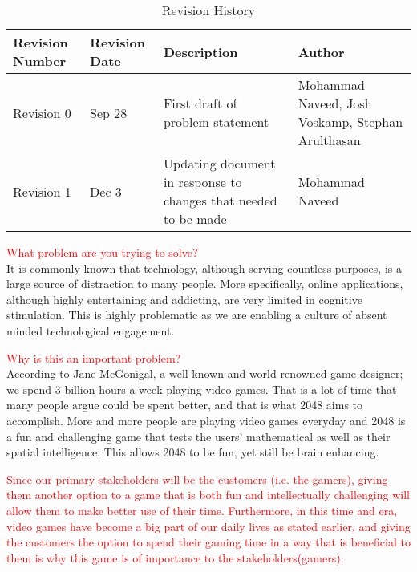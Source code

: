 \documentclass[12pt]{article}
\begin{document}
\begin{titlepage}



		\vfill %

\end{titlepage}
\begin{table}[H]
	\color{red}
	\centering
	\begin{tabular}{ | p{2cm} |  p{2cm} | p{5cm} | p{3.8cm} |}
    \hline
    Revision Number & Revision Date & Description & Author \\ \hline
		Revision 0 & Sep 28 & First draft of problem statement & Mohammad Naveed, Josh Voskamp, Stephan Arulthasan \\\hline
		Revision 1 & Dec 3 & Updating document in response to changes that needed to be made & Mohammad Naveed \\\hline
	\end{tabular}
	\caption{Revision History}
\end{table}
\newpage

\textcolor{red}{What problem are you trying to solve?}\\
It is commonly known that technology, although serving countless purposes, is a large source of distraction to many people. More specifically, online applications, although highly entertaining and addicting, are very limited in cognitive stimulation. This is highly problematic as we are enabling a culture of absent minded technological engagement. \par \vspace{5mm}

\textcolor{red}{Why is this an important problem?}\\
According to Jane McGonigal, a well known and world renowned game designer; we spend 3 billion hours a week playing video games. That is a lot of time that many people argue could be spent better, and that is what 2048 aims to accomplish. More and more people are playing video games everyday and 2048 is a fun and challenging game that tests the users' mathematical as well as their spatial intelligence. This allows 2048 to be fun, yet still be brain enhancing. \par \textcolor{red}{Since our primary stakeholders will be the customers (i.e. the gamers), giving them another option to a game that is both fun and intellectually challenging will allow them to make better use of their time. Furthermore, in this time and era, video games have become a big part of our daily lives as stated earlier, and giving the customers the option to spend their gaming time in a way that is beneficial to them is why this game is of importance to the stakeholders(gamers). } \par \vspace{5mm}
\end{document}
